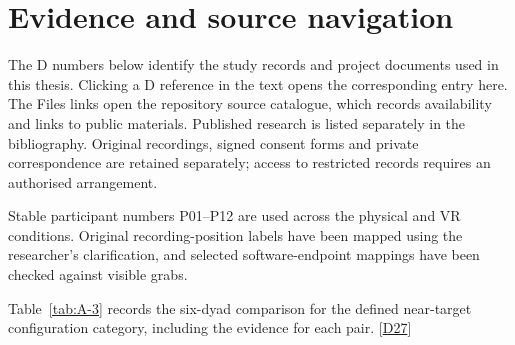 \chapter{Evidence and source navigation}\label{chap:A}

The D numbers below identify the study records and project documents used in this thesis. Clicking a D reference in the text opens the corresponding entry here. The Files links open the repository source catalogue, which records availability and links to public materials. Published research is listed separately in the bibliography. Original recordings, signed consent forms and private correspondence are retained separately; access to restricted records requires an authorised arrangement.

Stable participant numbers P01--P12 are used across the physical and VR conditions. Original recording-position labels have been mapped using the researcher's clarification, and selected software-endpoint mappings have been checked against visible grabs.

Table~\ref{tab:A-3} records the six-dyad comparison for the defined near-target configuration category, including the evidence for each pair. [\hyperlink{src:D27}{D27}]


